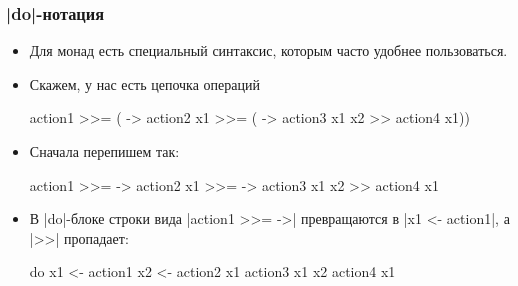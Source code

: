 \documentclass[11pt]{beamer}
\begin{document}
\begin{frame}[fragile]
  \frametitle{\haskinline|do|-нотация}
  \begin{itemize}
    \item Для монад есть специальный синтаксис, которым часто удобнее пользоваться.
    \item Скажем, у нас есть цепочка операций
          \begin{haskellsmall}
            action1 >>= ( -> action2 x1 >>=
              ( -> action3 x1 x2 >> action4 x1))
          \end{haskellsmall}
    \item
          Сначала перепишем так:
          \begin{haskellsmall}
            action1 >>=  ->
              action2 x1 >>=  ->
              action3 x1 x2 >>
              action4 x1
          \end{haskellsmall}
    \item
          В \haskinline|do|-блоке строки вида \haskinline|action1 >>=  ->| превращаются в \haskinline|x1 <- action1|, а \haskinline|>>| пропадает:
          \begin{haskellsmall}
            do x1 <- action1
               x2 <- action2 x1
               action3 x1 x2
               action4 x1
          \end{haskellsmall}
  \end{itemize}
\end{frame}
\end{document}
